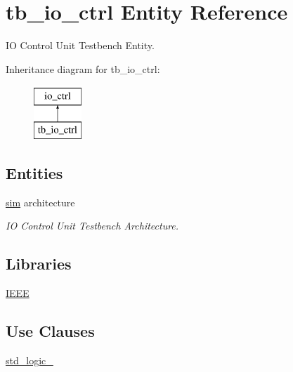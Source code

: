 \hypertarget{classtb__io__ctrl}{}\section{tb\+\_\+io\+\_\+ctrl Entity Reference}
\label{classtb__io__ctrl}


IO Control Unit Testbench Entity.  


Inheritance diagram for tb\+\_\+io\+\_\+ctrl\+:\begin{figure}[H]
\begin{center}
\leavevmode
\includegraphics[height=2.000000cm]{classtb__io__ctrl}
\end{center}
\end{figure}
\subsection*{Entities}
\begin{DoxyCompactItemize}
\item 
\hyperlink{classtb__io__ctrl_1_1sim}{sim} architecture
\begin{DoxyCompactList}\small\item\em IO Control Unit Testbench Architecture. \end{DoxyCompactList}\end{DoxyCompactItemize}
\subsection*{Libraries}
 \begin{DoxyCompactItemize}
\item 
\mbox{\label{classtb__io__ctrl_ae4f03c286607f3181e16b9aa12d0c6d4}} 
\hyperlink{classtb__io__ctrl_ae4f03c286607f3181e16b9aa12d0c6d4}{I\+E\+EE} 
\end{DoxyCompactItemize}
\subsection*{Use Clauses}
 \begin{DoxyCompactItemize}
\item 
\mbox{\label{classtb__io__ctrl_acd03516902501cd1c7296a98e22c6fcb}} 
\hyperlink{classtb__io__ctrl_acd03516902501cd1c7296a98e22c6fcb}{std\+\_\+logic\+\_}   
\end{DoxyCompactItemize}


